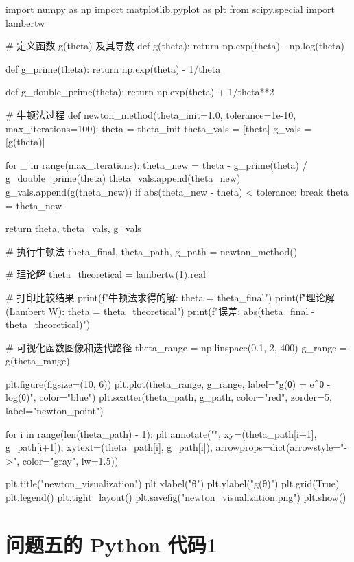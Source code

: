 \documentclass{MMCStyle}
\begin{document}
\begin{python}
    import numpy as np
import matplotlib.pyplot as plt
from scipy.special import lambertw

# 定义函数 g(theta) 及其导数
def g(theta):
    return np.exp(theta) - np.log(theta)

def g_prime(theta):
    return np.exp(theta) - 1/theta

def g_double_prime(theta):
    return np.exp(theta) + 1/theta**2

# 牛顿法过程
def newton_method(theta_init=1.0, tolerance=1e-10, max_iterations=100):
    theta = theta_init
    theta_vals = [theta]
    g_vals = [g(theta)]
    
    for _ in range(max_iterations):
        theta_new = theta - g_prime(theta) / g_double_prime(theta)
        theta_vals.append(theta_new)
        g_vals.append(g(theta_new))
        if abs(theta_new - theta) < tolerance:
            break
        theta = theta_new
    
    return theta, theta_vals, g_vals

# 执行牛顿法
theta_final, theta_path, g_path = newton_method()

# 理论解
theta_theoretical = lambertw(1).real

# 打印比较结果
print(f"牛顿法求得的解: theta = {theta_final}")
print(f"理论解 (Lambert W): theta = {theta_theoretical}")
print(f"误差: {abs(theta_final - theta_theoretical)}")

# 可视化函数图像和迭代路径
theta_range = np.linspace(0.1, 2, 400)
g_range = g(theta_range)

plt.figure(figsize=(10, 6))
plt.plot(theta_range, g_range, label="g(θ) = e^θ - log(θ)", color="blue")
plt.scatter(theta_path, g_path, color="red", zorder=5, label="newton_point")

for i in range(len(theta_path) - 1):
    plt.annotate("",
                 xy=(theta_path[i+1], g_path[i+1]),
                 xytext=(theta_path[i], g_path[i]),
                 arrowprops=dict(arrowstyle="->", color="gray", lw=1.5))

plt.title("newton_visualization")
plt.xlabel("θ")
plt.ylabel("g(θ)")
plt.grid(True)
plt.legend()
plt.tight_layout()
plt.savefig("newton_visualization.png")
plt.show()

\end{python}

	\section{问题五的 Python 代码1}
	
\end{document}
